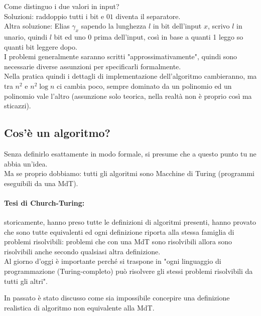 Come distinguo i due valori in input?  \\

Soluzioni: raddoppio tutti i bit e $01$ diventa il separatore. \\

Altra soluzione: Elias $\gamma_x$ sapendo la lunghezza $l$ in bit dell'input $x$, scrivo $l$ in unario, quindi $l$ bit ed uno $0$ prima dell'input, così in base a quanti 1 leggo so quanti bit leggere dopo.  \\

I problemi generalmente saranno scritti "approssimativamente", quindi sono necessarie diverse assunzioni per specificarli formalmente.\\

Nella pratica quindi i dettagli di implementazione dell'algoritmo cambieranno, ma tra $n^2$ e $n^2 \log n$ ci cambia poco, sempre dominato da un polinomio ed un polinomio vale l'altro (assunzione solo teorica, nella realtà non è proprio così ma sticazzi).

\newpage

\subsection{Cos'è un algoritmo?}
Senza definirlo esattamente in modo formale, si presume che a questo punto tu ne abbia un'idea.\\

Ma se proprio dobbiamo: tutti gli algoritmi sono Macchine di Turing (programmi eseguibili da una MdT). \\

\paragraph{Tesi di Church-Turing:} storicamente, hanno preso tutte le definizioni di algoritmi presenti, hanno provato che sono tutte equivalenti ed ogni definizione riporta alla stessa famiglia di problemi risolvibili: problemi che con una MdT sono risolvibili allora sono risolvibili anche secondo qualsiasi altra definizione.\\

Al giorno d'oggi è importante perché si traspone in "ogni linguaggio di programmazione (Turing-completo) può risolvere gli stessi problemi risolvibili da tutti gli altri". 

In passato è stato discusso come sia impossibile concepire una definizione realistica di algoritmo non equivalente alla MdT.\\

